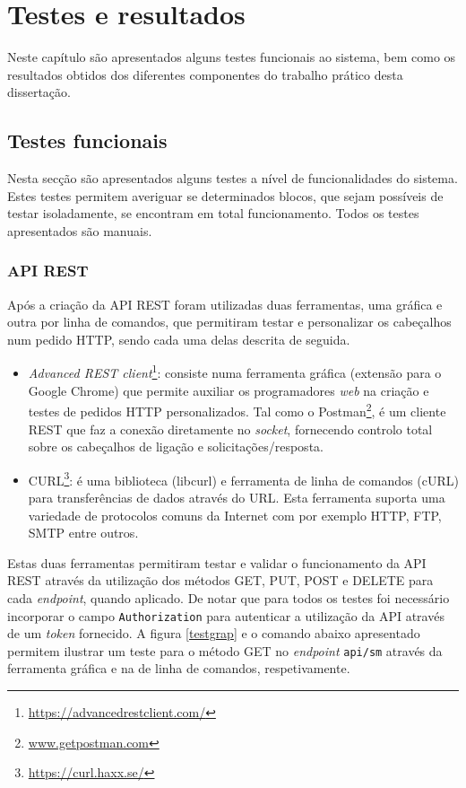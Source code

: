 \chapter{Testes e resultados}

Neste capítulo são apresentados alguns testes funcionais ao sistema, bem como os resultados obtidos dos diferentes componentes do trabalho prático desta dissertação. 

\section{Testes funcionais}


Nesta secção são apresentados alguns testes a nível de funcionalidades do sistema. Estes testes permitem averiguar se determinados blocos, que sejam possíveis de testar isoladamente, se encontram em total funcionamento. Todos os testes apresentados são manuais. 

\subsection{API REST}


Após a criação da \ac{API} \ac{REST} foram utilizadas duas ferramentas, uma gráfica e outra por linha de comandos, que permitiram testar e personalizar os cabeçalhos num pedido HTTP, sendo cada uma delas descrita de seguida.


\begin{itemize}
	\item \textit{Advanced REST client}\footnote{\url{https://advancedrestclient.com/}}: consiste numa ferramenta gráfica (extensão para o Google Chrome) que permite auxiliar os programadores \textit{web} na criação e testes de pedidos \ac{HTTP} personalizados. Tal como o Postman\footnote{\url{www.getpostman.com}}, é um cliente \ac{REST} que faz a conexão diretamente no \textit{socket}, fornecendo controlo total sobre os cabeçalhos de ligação e solicitações/resposta.
	 
	\item CURL\footnote{\url{https://curl.haxx.se/}}: é uma biblioteca (libcurl) e ferramenta de linha de comandos (cURL) para transferências de dados através do \ac{URL}. Esta ferramenta suporta uma variedade de protocolos comuns da Internet com por exemplo \ac{HTTP}, \ac{FTP}, \ac{SMTP} entre outros. 
\end{itemize}


Estas duas ferramentas permitiram testar e validar o funcionamento da API REST através da utilização dos métodos GET, PUT, POST e DELETE para cada \textit{endpoint}, quando aplicado. De notar que para todos os testes foi necessário incorporar o campo \texttt{Authorization} para autenticar a utilização da API através de um \textit{token} fornecido. A figura \ref{testgrap} e o comando abaixo apresentado permitem ilustrar um teste para o método GET no \textit{endpoint} \texttt{api/sm} através da ferramenta gráfica e na de linha de comandos, respetivamente. 

